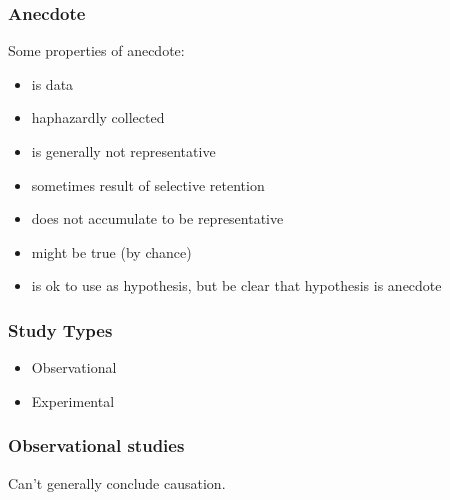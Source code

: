 \documentclass[t]{beamer}
\begin{document}
\begin{frame}
  \frametitle{Anecdote}

  Some properties of anecdote:
  
  \begin{itemize}
  \item is data
  \item haphazardly collected
  \item is generally not representative
  \item sometimes result of selective retention
  \item does not accumulate to be representative
  \item might be true (by chance)
  \item is ok to use as hypothesis, but be clear that hypothesis is anecdote
  \end{itemize}
\end{frame}

\begin{frame}
  \frametitle{Study Types}

  \begin{itemize}
  \item Observational
  \item Experimental
  \end{itemize}
  
  \note {
    
  }

\end{frame}

\begin{frame}
  \frametitle{Observational studies}

  Can't generally conclude causation.

  
\end{frame}
\end{document}
